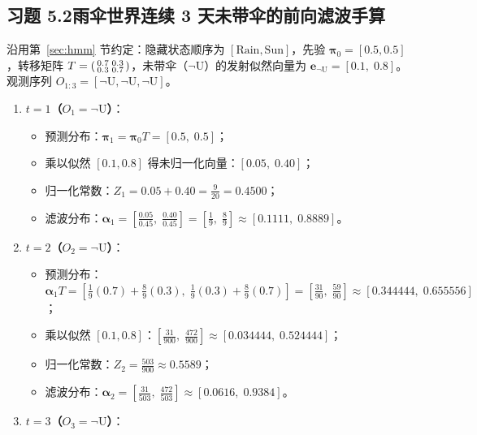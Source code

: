 \subsection*{习题 5.2\quad 雨伞世界连续 3 天未带伞的前向滤波手算}
沿用第~\ref{sec:hmm} 节约定：隐藏状态顺序为 $[\text{Rain}, \text{Sun}]$，先验 $\boldsymbol{\pi}_0 = [0.5, 0.5]$，转移矩阵 $T = \begin{psmallmatrix}0.7 & 0.3\\ 0.3 & 0.7\end{psmallmatrix}$，未带伞（$\neg\text{U}$）的发射似然向量为 $\mathbf{e}_{\neg\text{U}} = [0.1,\; 0.8]$。观测序列 $O_{1:3} = [\neg\text{U}, \neg\text{U}, \neg\text{U}]$。
\begin{enumerate}[label=\textbf{第 \arabic* 天:}, leftmargin=4.2em]
  \item \textbf{$t=1$（$O_1 = \neg\text{U}$）}：
  \begin{itemize}
    \item 预测分布：$\boldsymbol{\pi}_1 = \boldsymbol{\pi}_0 T = [0.5,\; 0.5]$；
    \item 乘以似然 $[0.1, 0.8]$ 得未归一化向量：$[0.05,\; 0.40]$；
    \item 归一化常数：$Z_1 = 0.05 + 0.40 = \frac{9}{20} = \mathbf{0.4500}$；
    \item 滤波分布：$\boldsymbol{\alpha}_1 = \left[\frac{0.05}{0.45},\; \frac{0.40}{0.45}\right] = \left[\frac{1}{9},\; \frac{8}{9}\right] \approx [\mathbf{0.1111},\; \mathbf{0.8889}]$。
  \end{itemize}
  \item \textbf{$t=2$（$O_2 = \neg\text{U}$）}：
  \begin{itemize}
    \item 预测分布：$\boldsymbol{\alpha}_1 T = \left[\frac{1}{9}(0.7)+\frac{8}{9}(0.3),\; \frac{1}{9}(0.3)+\frac{8}{9}(0.7)\right] = \left[\frac{31}{90},\; \frac{59}{90}\right] \approx [0.344444,\; 0.655556]$；
    \item 乘以似然 $[0.1, 0.8]$：$\left[\frac{31}{900},\; \frac{472}{900}\right] \approx [0.034444,\; 0.524444]$；
    \item 归一化常数：$Z_2 = \frac{503}{900} \approx \mathbf{0.5589}$；
    \item 滤波分布：$\boldsymbol{\alpha}_2 = \left[\frac{31}{503},\; \frac{472}{503}\right] \approx [\mathbf{0.0616},\; \mathbf{0.9384}]$。
  \end{itemize}
  \item \textbf{$t=3$（$O_3 = \neg\text{U}$）}：
  \begin{itemize}

\end{itemize}
\end{enumerate}
